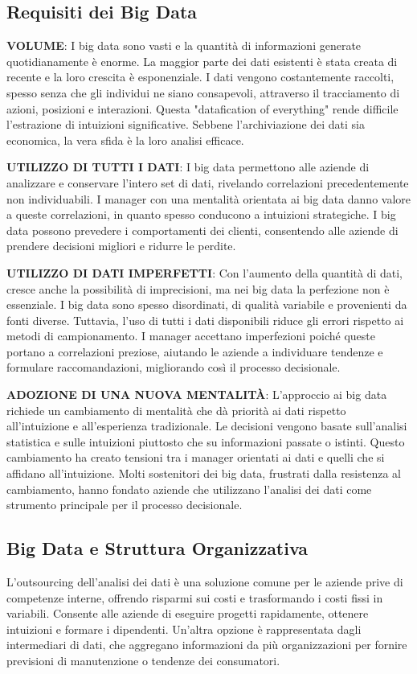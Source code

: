 \documentclass{article}
\begin{document}
\subsection{Requisiti dei Big Data}
\textbf{VOLUME}: I big data sono vasti e la quantità di informazioni generate quotidianamente è enorme. La maggior parte dei dati esistenti è stata creata di recente e la loro crescita è esponenziale. I dati vengono costantemente raccolti, spesso senza che gli individui ne siano consapevoli, attraverso il tracciamento di azioni, posizioni e interazioni. Questa "datafication of everything" rende difficile l'estrazione di intuizioni significative. Sebbene l'archiviazione dei dati sia economica, la vera sfida è la loro analisi efficace.

\textbf{UTILIZZO DI TUTTI I DATI}: I big data permettono alle aziende di analizzare e conservare l'intero set di dati, rivelando correlazioni precedentemente non individuabili. I manager con una mentalità orientata ai big data danno valore a queste correlazioni, in quanto spesso conducono a intuizioni strategiche. I big data possono prevedere i comportamenti dei clienti, consentendo alle aziende di prendere decisioni migliori e ridurre le perdite.

\textbf{UTILIZZO DI DATI IMPERFETTI}: Con l'aumento della quantità di dati, cresce anche la possibilità di imprecisioni, ma nei big data la perfezione non è essenziale. I big data sono spesso disordinati, di qualità variabile e provenienti da fonti diverse. Tuttavia, l'uso di tutti i dati disponibili riduce gli errori rispetto ai metodi di campionamento. I manager accettano imperfezioni poiché queste portano a correlazioni preziose, aiutando le aziende a individuare tendenze e formulare raccomandazioni, migliorando così il processo decisionale.

\textbf{ADOZIONE DI UNA NUOVA MENTALITÀ}: L'approccio ai big data richiede un cambiamento di mentalità che dà priorità ai dati rispetto all'intuizione e all'esperienza tradizionale. Le decisioni vengono basate sull'analisi statistica e sulle intuizioni piuttosto che su informazioni passate o istinti. Questo cambiamento ha creato tensioni tra i manager orientati ai dati e quelli che si affidano all'intuizione. Molti sostenitori dei big data, frustrati dalla resistenza al cambiamento, hanno fondato aziende che utilizzano l'analisi dei dati come strumento principale per il processo decisionale.

\subsection{Big Data e Struttura Organizzativa}
L'outsourcing dell'analisi dei dati è una soluzione comune per le aziende prive di competenze interne, offrendo risparmi sui costi e trasformando i costi fissi in variabili. Consente alle aziende di eseguire progetti rapidamente, ottenere intuizioni e formare i dipendenti. Un'altra opzione è rappresentata dagli intermediari di dati, che aggregano informazioni da più organizzazioni per fornire previsioni di manutenzione o tendenze dei consumatori.
\end{document}

